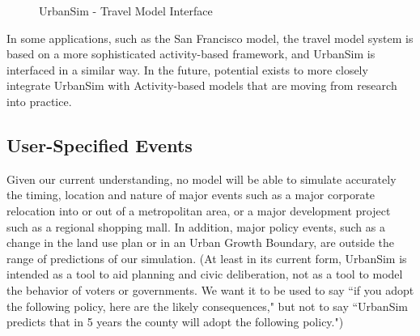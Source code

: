 \begin{figure}[ht]
\center {}
\caption{UrbanSim - Travel Model Interface} \label{fig:TMinterface}
\end{figure}

In some applications, such as the San Francisco model, the travel model system is based on a more sophisticated activity-based
framework, and UrbanSim is interfaced in a similar way. In the future, potential exists to more closely integrate UrbanSim with
Activity-based models that are moving from research into practice.

\subsection{User-Specified Events}

Given our current understanding, no model will be able to simulate
accurately the timing, location and nature of major events such as
a major corporate relocation into or out of a metropolitan area,
or a major development project such as a regional shopping mall.
In addition, major policy events, such as a change in the land use
plan or in an Urban Growth Boundary, are outside the range of
predictions of our simulation.  (At least in its current form,
UrbanSim is intended as a tool to aid planning and civic
deliberation, not as a tool to model the behavior of voters or
governments.  We want it to be used to say ``if you adopt the
following policy, here are the likely consequences," but not to
say ``UrbanSim predicts that in 5 years the county will adopt the
following policy.")

